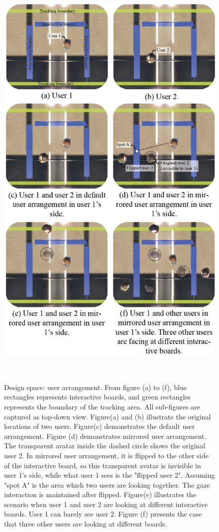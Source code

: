 \documentclass{sigchi}
\begin{document}
\begin{figure}[t!]
 \centering
 \includegraphics[width=0.95\columnwidth]{Figure3.png}
 \caption{Design space: user arrangement. From figure (a) to (f), blue rectangles represents interactive boards, and green rectangles represents the boundary of the tracking area. All sub-figures are captured as top-down view. Figure(a) and (b) illustrate the original locations of two users. Figure(c) demonstrates the default user arrangement. Figure (d) demonstrates mirrored user arrangement. The transparent avatar inside the dashed circle shows the original user 2. In mirrored user arrangement, it is flipped to the other side of the interactive board, so this transparent avatar is invisible in user 1's side, while what user 1 sees is the "flipped user 2". Assuming "spot A" is the area which two users are looking together. The gaze interaction is maintained after flipped. Figure(e) illustrates the scenario when user 1 and user 2 are looking at different interactive boards. User 1 can barely see user 2. Figure (f) presents the case that three other users are looking at different boards.
 }~\label{fig:userarrangement}
\end{figure}
\end{document}

